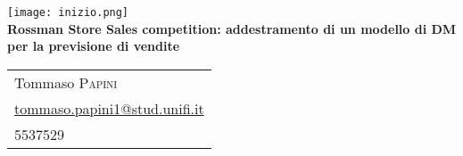 \begin{center}
   	\texttt{[image: inizio.png]}\\[0.8cm]
	{\huge\bfseries Rossman Store Sales competition: addestramento di un modello di DM per la previsione di vendite}\\[0.8cm]

	\begin{tabular*}{\linewidth}{@{\extracolsep{\fill}}l}
		Tommaso \textsc{Papini}\\
		\href{mailto:tommaso.papini1@stud.unifi.it}{tommaso.papini1@stud.unifi.it}\\
		5537529
	\end{tabular*}\\[1.2cm]
\end{center}

